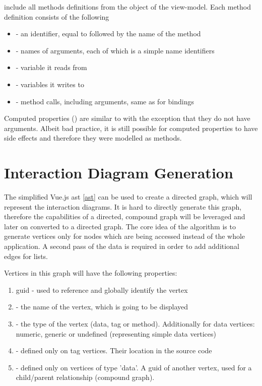  include all methods definitions from the  object of the view-model. Each method definition consists of the following
\begin{itemize}
    \item {} - an identifier, equal to  followed by the name of the method
    \item {} - names of arguments, each of which is a simple name identifiers
    \item {} - variable it reads from
    \item {} - variables it writes to
    \item {} - method calls, including arguments, same as for bindings 
\end{itemize}

Computed properties () are similar to  with the exception that they do not have arguments. Albeit bad practice, it is still possible for computed properties to have side effects and therefore they were modelled as methods.

\section{Interaction Diagram Generation}

The simplified Vue.js \gls{ast} \ref{ast} can be used to create a directed graph, which will represent the interaction diagrams. It is hard to directly generate this graph, therefore the capabilities of a directed, compound graph will be leveraged and later on converted to a directed graph. 
The core idea of the algorithm is to generate vertices only for nodes which are being accessed instead of the whole application. A second pass of the data is required in order to add additional edges for lists.

Vertices in this graph will have the following properties:
\label{concept:interaction_diagram_structure}
\begin{enumerate}
    \item \gls{guid} - used to reference and globally identify the vertex 
    \item {} - the name of the vertex, which is going to be displayed
    \item {} - the type of the vertex (data, tag or method). Additionally for data vertices: numeric, generic or undefined (representing simple data vertices)
    \item {} - defined only on tag vertices. Their location in the source code
    \item {} - defined only on vertices of type 'data'. A \gls{guid} of another vertex, used for a child/parent relationship (compound graph).
\end{enumerate}


